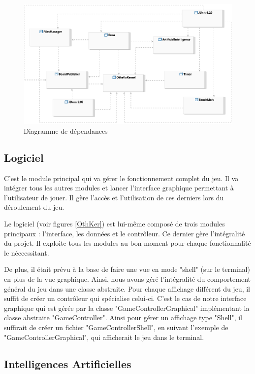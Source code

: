 \begin{figure}[H]
\centering
\includegraphics[scale=0.64]{Architecture/DiagrammeDependances.png}
\caption{Diagramme de dépendances}
\label{glob}
\end{figure}

\subsection{Logiciel}

C'est le module principal qui va gérer le fonctionnement complet du jeu. Il va intégrer tous les autres modules et lancer l'interface graphique permettant à l'utilisateur de jouer. Il gère l'accès et l'utilisation de ces derniers lors du déroulement du jeu.

Le logiciel (voir figures \ref{OthKer}) est lui-même composé de trois modules principaux : l'interface, les données et le contrôleur.
Ce dernier gère l'intégralité du projet. Il exploite tous les modules au bon moment pour chaque fonctionnalité le néccessitant.

De plus, il était prévu à la base de faire une vue en mode "shell" (sur le terminal) en plus de la vue graphique. Ainsi, nous avons géré l'intégralité du comportement général du jeu dans une classe abstraite. Pour chaque affichage différent du jeu, il suffit de créer un contrôleur qui spécialise celui-ci. C'est le cas de notre interface graphique qui est gérée par la classe "GameControllerGraphical" implémentant la classe abstraite "GameController". Ainsi pour gérer un affichage type "Shell", il suffirait de créer un fichier "GameControllerShell", en suivant l'exemple de "GameControllerGraphical", qui afficherait le jeu dans le terminal.

\subsection{Intelligences Artificielles}


